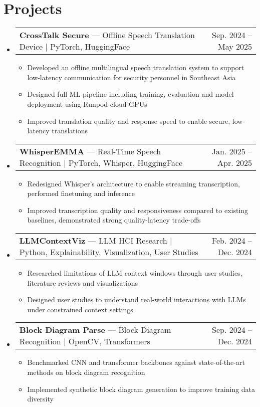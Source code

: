 \documentclass[letterpaper,11pt]{article}
\makeatletter
\newcommand{\resumeItem}[1]{
  \item\small{
    {#1 \vspace{-2pt}}
  }
}
\newcommand{\resumeProjectHeading}[2]{
    \item
    \begin{tabular*}{0.97\textwidth}{l@{\extracolsep{\fill}}r}
      \small#1 & \textnormal{\small #2} \\
    \end{tabular*}\vspace{-7pt}
}
\newcommand{\resumeSubHeadingListStart}{\begin{itemize}[leftmargin=0.15in, label={}]}
\newcommand{\resumeSubHeadingListEnd}{\end{itemize}}
\newcommand{\resumeItemListStart}{\begin{itemize}}
\newcommand{\resumeItemListEnd}{\end{itemize}\vspace{-5pt}}
\makeatother
\begin{document}
\section{Projects}
    \resumeSubHeadingListStart
      \resumeProjectHeading
          {\textbf{CrossTalk Secure} --- Offline Speech Translation Device $|$ PyTorch, HuggingFace}{Sep. 2024 -- May 2025}
          \resumeItemListStart
            \resumeItem{Developed an offline multilingual speech translation system to support low-latency communication for security personnel in Southeast Asia}
            \resumeItem{Designed full ML pipeline including training, evaluation and model deployment using Runpod cloud GPUs}
            \resumeItem{Improved translation quality and response speed to enable secure, low-latency translations}
          \resumeItemListEnd

      \resumeProjectHeading
          {\textbf{WhisperEMMA} --- Real-Time Speech Recognition $|$ PyTorch, Whisper, HuggingFace}{Jan. 2025 -- Apr. 2025}
          \resumeItemListStart
            \resumeItem{Redesigned Whisper's architecture to enable streaming transcription, performed finetuning and inference}
            \resumeItem{Improved transcription quality and responsiveness compared to existing baselines, demonstrated strong quality-latency trade-offs}
          \resumeItemListEnd
    
      \resumeProjectHeading
          {\textbf{LLMContextViz} --- LLM HCI Research $|$ Python, Explainability, Visualization, User Studies}{Feb. 2024 -- Dec. 2024}
          \resumeItemListStart
            \resumeItem{Researched limitations of LLM context windows through user studies, literature reviews and visualizations}
            \resumeItem{Designed user studies to understand real-world interactions with LLMs under constrained context settings}
          \resumeItemListEnd

      \resumeProjectHeading
          {\textbf{Block Diagram Parse} --- Block Diagram Recognition $|$ OpenCV, Transformers}{Sep. 2024 -- Dec. 2024}
          \resumeItemListStart
            \resumeItem{Benchmarked CNN and transformer backbones against state-of-the-art methods on block diagram recognition}
            \resumeItem{Implemented synthetic block diagram generation to improve training data diversity}
          \resumeItemListEnd

    \resumeSubHeadingListEnd

\end{document}
